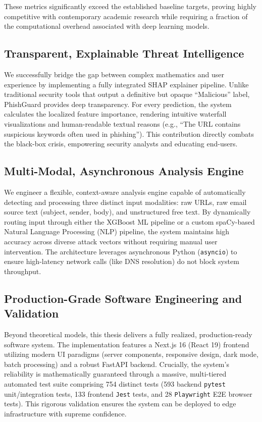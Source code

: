 These metrics significantly exceed the established baseline targets,
proving highly competitive with contemporary academic research while
requiring a fraction of the computational overhead associated with deep
learning models.

\subsection{Transparent, Explainable Threat
Intelligence}\label{transparent-explainable-threat-intelligence}

We successfully bridge the gap between complex mathematics and user
experience by implementing a fully integrated SHAP explainer pipeline.
Unlike traditional security tools that output a definitive but opaque
``Malicious'' label, PhishGuard provides deep transparency. For every
prediction, the system calculates the localized feature importance,
rendering intuitive waterfall visualizations and human-readable textual
reasons (e.g., ``The URL contains suspicious keywords often used in
phishing''). This contribution directly combats the black-box crisis,
empowering security analysts and educating end-users.

\subsection{Multi-Modal, Asynchronous Analysis
Engine}\label{multi-modal-asynchronous-analysis-engine}

We engineer a flexible, context-aware analysis engine capable of
automatically detecting and processing three distinct input modalities:
raw URLs, raw email source text (subject, sender, body), and
unstructured free text. By dynamically routing input through either the
XGBoost ML pipeline or a custom spaCy-based Natural Language Processing
(NLP) pipeline, the system maintains high accuracy across diverse attack
vectors without requiring manual user intervention. The architecture
leverages asynchronous Python (\texttt{asyncio}) to ensure high-latency
network calls (like DNS resolution) do not block system throughput.

\subsection{Production-Grade Software Engineering and
Validation}\label{production-grade-software-engineering-and-validation}

Beyond theoretical models, this thesis delivers a fully realized,
production-ready software system. The implementation features a Next.js
16 (React 19) frontend utilizing modern UI paradigms (server components,
responsive design, dark mode, batch processing) and a robust FastAPI
backend. Crucially, the system's reliability is mathematically
guaranteed through a massive, multi-tiered automated test suite
comprising 754 distinct tests (593 backend \texttt{pytest}
unit/integration tests, 133 frontend \texttt{Jest} tests, and 28
\texttt{Playwright} E2E browser tests). This rigorous validation ensures
the system can be deployed to edge infrastructure with supreme
confidence.

